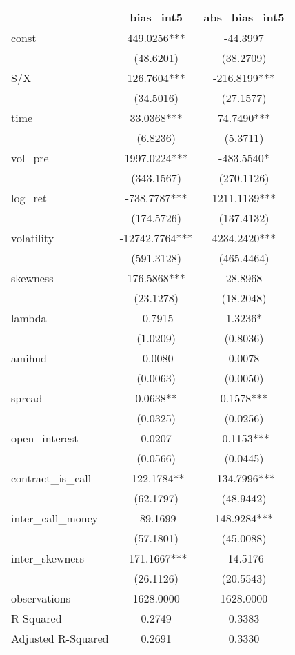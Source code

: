 \begin{tabular}{lcc}
\hline
                   &   bias\_int5   & abs\_bias\_int5  \\
\midrule
\midrule
const              & 449.0256***    & -44.3997         \\
                   & (48.6201)      & (38.2709)        \\
S/X                & 126.7604***    & -216.8199***     \\
                   & (34.5016)      & (27.1577)        \\
time               & 33.0368***     & 74.7490***       \\
                   & (6.8236)       & (5.3711)         \\
vol\_pre           & 1997.0224***   & -483.5540*       \\
                   & (343.1567)     & (270.1126)       \\
log\_ret           & -738.7787***   & 1211.1139***     \\
                   & (174.5726)     & (137.4132)       \\
volatility         & -12742.7764*** & 4234.2420***     \\
                   & (591.3128)     & (465.4464)       \\
skewness           & 176.5868***    & 28.8968          \\
                   & (23.1278)      & (18.2048)        \\
lambda             & -0.7915        & 1.3236*          \\
                   & (1.0209)       & (0.8036)         \\
amihud             & -0.0080        & 0.0078           \\
                   & (0.0063)       & (0.0050)         \\
spread             & 0.0638**       & 0.1578***        \\
                   & (0.0325)       & (0.0256)         \\
open\_interest     & 0.0207         & -0.1153***       \\
                   & (0.0566)       & (0.0445)         \\
contract\_is\_call & -122.1784**    & -134.7996***     \\
                   & (62.1797)      & (48.9442)        \\
inter\_call\_money & -89.1699       & 148.9284***      \\
                   & (57.1801)      & (45.0088)        \\
inter\_skewness    & -171.1667***   & -14.5176         \\
                   & (26.1126)      & (20.5543)        \\
observations       & 1628.0000      & 1628.0000        \\
R-Squared          & 0.2749         & 0.3383           \\
Adjusted R-Squared & 0.2691         & 0.3330           \\
\hline
\end{tabular}